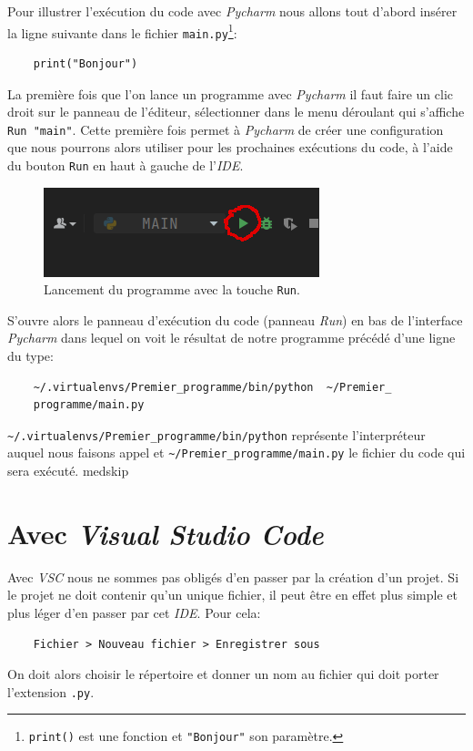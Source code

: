 \documentclass[a4paper,12pt]{book}
\begin{document}
Pour illustrer l'exécution du code avec \textit{Pycharm} nous allons tout d'abord insérer la ligne suivante dans le fichier \texttt{main.py}\footnote{\texttt{print()} est une fonction et \texttt{"Bonjour"} son paramètre.}:
\begin{verbatim}
    print("Bonjour")
\end{verbatim}
\medskip

La première fois que l'on lance un programme avec \textit{Pycharm} il faut faire un clic droit sur le panneau de l'éditeur, sélectionner dans le menu déroulant qui s'affiche \texttt{Run "main"}. Cette première fois permet à \textit{Pycharm} de créer une configuration que nous pourrons alors utiliser pour les prochaines exécutions du code, à l'aide du bouton \texttt{Run} en haut à gauche de l'\textit{IDE}.
\begin{figure}[h]
\begin{center}
\includegraphics[scale=0.5]{IMG/Pycharm-04.png}
\caption{Lancement du programme avec la touche \texttt{Run}.}
\end{center}
\end{figure}
\medskip

S'ouvre alors le panneau d'exécution du code (panneau \textit{Run}) en bas de l'interface \textit{Pycharm} dans lequel on voit le résultat de notre programme précédé d'une ligne du type:
\begin{verbatim}
    ~/.virtualenvs/Premier_programme/bin/python  ~/Premier_
    programme/main.py
\end{verbatim}
\verb|~/.virtualenvs/Premier_programme/bin/python| représente l'interpréteur auquel nous faisons appel et \verb|~/Premier_programme/main.py| le fichier du code qui sera exécuté.
medskip

\section{Avec \textit{Visual Studio Code}}
Avec \textit{VSC} nous ne sommes pas obligés d'en passer par la création d'un projet. Si le projet ne doit contenir qu'un unique fichier, il peut être en effet plus simple et plus léger d'en passer par cet \textit{IDE}. Pour cela:
\begin{verbatim}
    Fichier > Nouveau fichier > Enregistrer sous
\end{verbatim}
On doit alors choisir le répertoire et donner un nom au fichier qui doit porter l'extension \texttt{.py}.
\medskip
\end{document}
